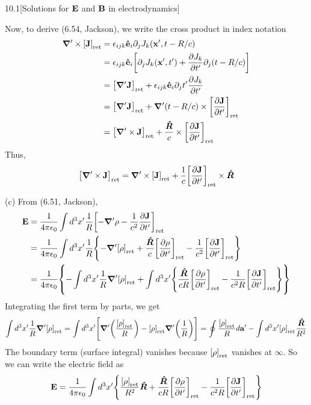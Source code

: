 \documentclass[12pt]{article}
\newcommand{\ret}[1]{\qty[#1]_\text{ret}}
\newcommand{\Rhat}{\bm{\hat{R}}}
\begin{document}
\begin{problem}{10.1}[Solutions for $\vb{E}$ and $\vb{B}$ in electrodynamics]
\begin{solution}
Now, to derive (6.54, Jackson), we write the cross product in index notation
\begin{align}
    \grad'\times\ret{\vb{J}}
    &=\epsilon_{ijk}\vb{\hat{e}}_i\partial_j J_k(\vb{x}',t-R/c)\notag\\
    &=\epsilon_{ijk}\vb{\hat{e}}_i\qty[\partial_jJ_k(\vb{x}',t')+\frac{\partial
    J_k}{\partial t'}\partial_j(t-R/c)]\notag\\
    &=\ret{\grad'\vb{J}}+\epsilon_{ijk}\vb{\hat{e}}_i\partial_jt'\frac{\partial
    J_k}{\partial t'}\notag\\
    &=\ret{\grad'\vb{J}}+\grad'(t-R/c)\times\ret{\frac{\partial\vb{J}}{\partial
    t'}}\notag\\
    &=\ret{\grad'\times\vb{J}}+\frac{\Rhat}{c}\times\ret{\frac{\partial\vb{J}}{\partial
    t'}}
\end{align}
Thus,
\begin{equation}
    \ret{\grad'\times\vb{J}}=\grad'\times\ret{\vb{J}}
    +\frac1c\ret{\frac{\partial\vb{J}}{\partial t'}}\times\Rhat
\end{equation}

(c) From (6.51, Jackson),
\begin{align}
    \vb{E}
    &=\frac1{4\pi\epsilon_0}\int
    d^3x'\frac1R\ret{-\grad'\rho-\frac1{c^2}\frac{\partial\vb{J}}{\partial
    t'}}\notag\\
    &=\frac1{4\pi\epsilon_0}\int d^3x'\frac1R\qty{
        -\grad'\ret\rho+\frac{\Rhat}{c}\ret{\frac{\partial\rho
        }{\partial t'}}-\frac1{c^2}\ret{\frac{\partial\vb{J}}{\partial t'}}
    }\notag\\
    &=\frac1{4\pi\epsilon_0}\qty{
        -\int d^3x'\frac1R\grad'\ret\rho+\int d^3x'
        \qty{\frac{\Rhat}{cR}\ret{\frac{\partial\rho}{\partial
        t'}}-\frac1{c^2R}\ret{\frac{\partial\vb{J}}{\partial t'}}}
    }
\end{align}
Integrating the first term by parts, we get
\begin{equation}
    \int d^3x'\frac1R\grad'\ret\rho
    =\int d^3x'\qty[\grad'\qty(\frac{\ret\rho}{R})-\ret\rho\grad'\qty(\frac1R)]
    =\oint\frac{\ret\rho}{R}d\vb{a}'
    -\int d^3x'\ret\rho\frac{\Rhat}{R^2}
\end{equation}
The boundary term (surface integral) vanishes because $\ret\rho$ vanishes at
$\infty$. So we can write the electric field as
\begin{align}
    \vb{E}=\frac1{4\pi\epsilon_0}\int d^3x'\qty{
        \frac{\ret\rho}{R^2}\Rhat+\frac{\Rhat}{cR}\ret{\frac{\partial\rho}{\partial
        t'}}
        -\frac1{c^2R}\ret{\frac{\partial\vb{J}}{\partial t'}}
    } 
\end{align}


\end{solution}
\end{problem}
\end{document}
